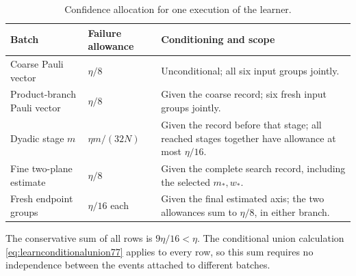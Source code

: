 \begin{table}[ht]
\caption{Confidence allocation for one execution of the learner.}
\label{tab:learnconfidence77}
\small
\begin{tabular}{@{}p{.27\linewidth}p{.19\linewidth}p{.44\linewidth}@{}}
\toprule
Batch & Failure allowance & Conditioning and scope\\
\midrule
Coarse Pauli vector & $\eta/8$ & Unconditional; all six input groups
 jointly.\\[2pt]
Product-branch Pauli vector & $\eta/8$ & Given the coarse record;
 six fresh input groups jointly.\\[2pt]
Dyadic stage $m$ & $\eta m/(32N)$ & Given the record before that
 stage; all reached stages together have allowance at most
 $\eta/16$.\\[2pt]
Fine two-plane estimate & $\eta/8$ & Given the complete search
 record, including the selected $m_*,w_*$.\\[2pt]
Fresh endpoint groups & $\eta/16$ each & Given the final estimated
 axis; the two allowances sum to $\eta/8$, in either branch.\\
\bottomrule
\end{tabular}
\end{table}

The conservative sum of all rows is $9\eta/16<\eta$.
The conditional union calculation \eqref{eq:learnconditionalunion77}
applies to every row, so this sum requires no independence between
the events attached to different batches.

